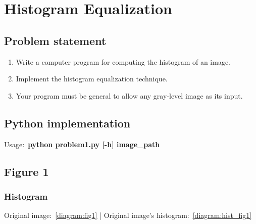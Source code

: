 \chapter{Histogram Equalization}

\section{Problem statement}

\begin{enumerate}
    \item Write a computer program for computing the histogram of an image.\\
    \item Implement the histogram equalization technique.\\
    \item Your program must be general to allow any gray-level image as its input.\\
\end{enumerate}

\section{Python implementation}

Usage:~\textbf{python problem1.py [-h] image\_path}

\section{Figure 1}

    \subsection{Histogram}

    Original image:~\ref{diagram:fig1} |
    Original image's histogram:~\ref{diagram:hist_fig1}


